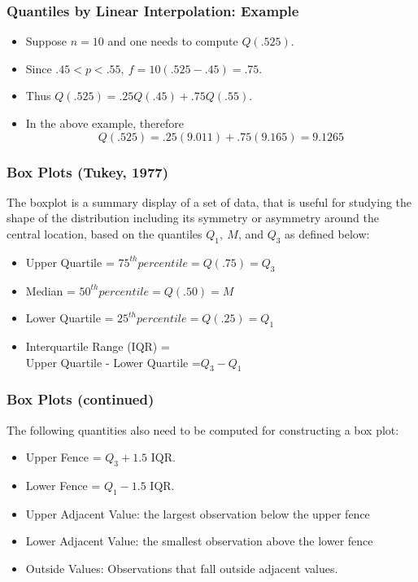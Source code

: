 \documentclass[xcolor=dvipsnames,12pt]{beamer}
\begin{document}
\begin{frame}
\frametitle{Quantiles by Linear Interpolation: Example}
\begin{itemize}
\item Suppose $n = 10$ and one needs to compute  $Q(.525)$.  
\item Since  
$.45 < p < .55, \ f = 10 (.525 - .45)  = .75$. 
\item Thus  $Q(.525)=.25Q(.45) +
.75Q(.55)$.
\item In the above example, therefore $$Q(.525)= .25(9.011)+.75(9.165)=9.1265$$
\end{itemize}
\end{frame}


\begin{frame}
\frametitle{Box Plots (Tukey, 1977)}
The  boxplot is a summary display of a set of data, that is useful for
studying the shape of the distribution including its
symmetry or asymmetry  around the central location, based on the quantiles
$Q_1,\ M$, and $Q_3$ as defined below:
\begin{itemize}
\item Upper Quartile = $75^{ th} { percentile} =Q(.75)=Q_3$
\item Median  = $50^{ th} { percentile} =Q(.50)=M$
\item Lower Quartile  = $25^{ th} {percentile} =Q(.25)= Q_1$
\item Interquartile Range (IQR) = \\
 Upper Quartile -  Lower Quartile  =$Q_3- Q_1$
\end{itemize}
\end{frame}



\begin{frame}
\frametitle{Box Plots (continued)}
 The following quantities also need to be
computed for constructing a box plot:
\begin{itemize}
\item Upper Fence =  $Q_3 + 1.5$ IQR. 
\item Lower Fence =  $Q_1 - 1.5$ IQR.
\item Upper Adjacent Value:  the largest observation  below the upper fence
\item Lower Adjacent Value:  the smallest observation above the lower fence   
\item Outside Values:  Observations that fall outside adjacent values.  
\end{itemize}
\end{frame}
\end{document}
